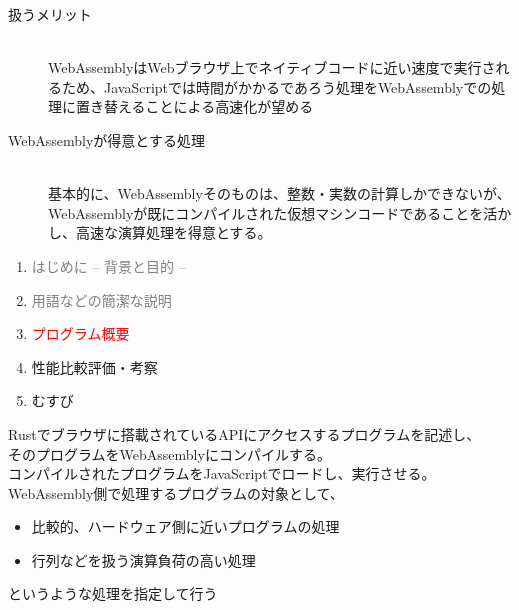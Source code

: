 \begin{description}
	\item[扱うメリット]~\\
	WebAssemblyはWebブラウザ上でネイティブコードに近い速度で実行される\cite{WasmLikeNativeSpeed}ため、JavaScriptでは時間がかかるであろう処理をWebAssemblyでの処理に置き替えることによる高速化が望める
	\item[WebAssemblyが得意とする処理]~\\
	基本的に、WebAssemblyそのものは、整数・実数の計算しかできない\cite{WasmOnlyCalc}が、WebAssemblyが既にコンパイルされた仮想マシンコードであることを活かし、高速な演算処理を得意とする。	
\end{description}
\newpage
\begin{enumerate}[itemsep=0.25\zh]
	\item \textcolor{gray}{はじめに -- 背景と目的 --}
	\item \textcolor{gray}{用語などの簡潔な説明}
	\item \textcolor{red}{プログラム概要}
	\item 性能比較評価・考察
	\item むすび
\end{enumerate}
\newpage


Rustでブラウザに搭載されているAPIにアクセスするプログラムを記述し、\\そのプログラムをWebAssemblyにコンパイルする。\\コンパイルされたプログラムをJavaScriptでロードし、実行させる。\\
WebAssembly側で処理するプログラムの対象として、
\begin{itemize}
	\item 比較的、ハードウェア側に近いプログラムの処理
	\item 行列などを扱う演算負荷の高い処理
\end{itemize}
というような処理を指定して行う

\newpage

